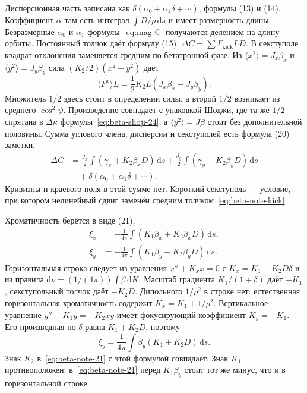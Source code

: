 \documentclass[aps,pra,preprint,a4paper,amsmath,amssymb,longbibliography]{revtex4-2}
\begin{document}
Дисперсионная часть записана как $\delta(\alpha_0+\alpha_1\delta+\cdots)$, формулы (13) и (14). Коэффициент $\alpha$ там есть интеграл $\int D/\rho\,\mathrm{d}s$ и имеет размерность длины. Безразмерные $\alpha_0$ и $\alpha_1$ формулы~\eqref{eq:mag-C} получаются делением на длину орбиты. Постоянный толчок даёт формулу (15), $\Delta C=\sum F_{\mathrm{kick}} L D$. В секступоле квадрат отклонения заменяется средним по бетатронной фазе. Из $\langle x^2\rangle=J_x\beta_x$ и $\langle y^2\rangle=J_y\beta_y$ сила $(K_2/2)(x^2-y^2)$ даёт
\begin{equation}
\label{eq:beta-note-kick}
\langle F^x\rangle L
=\frac{1}{2}K_2 L(J_x\beta_x-J_y\beta_y).
\end{equation}
Множитель $1/2$ здесь стоит в определении силы, а второй $1/2$ возникает из среднего $\cos^2\psi$. Произведение совпадает с упаковкой Шоджи, где та же $1/2$ спрятана в $\Delta\kappa$ формулы~\eqref{eq:beta-shoji-24}, а $\langle y^2\rangle=J\beta$ стоит без дополнительной половины. Сумма углового члена, дисперсии и секступолей есть формула (20) заметки,
\begin{equation}
\label{eq:beta-note-20}
\begin{aligned}
\Delta C
&=\frac{J_x}{2}\int(\gamma_x+K_2\beta_x D)\,\mathrm{d}s
+\frac{J_y}{2}\int(\gamma_y-K_2\beta_y D)\,\mathrm{d}s
\\
&\quad+\delta(\alpha_0+\alpha_1\delta+\cdots).
\end{aligned}
\end{equation}
Кривизны и краевого поля в этой сумме нет. Короткий секступоль --- условие, при котором нелинейный сдвиг заменён средним толчком~\eqref{eq:beta-note-kick}.

Хроматичность берётся в виде (21),
\begin{equation}
\label{eq:beta-note-21}
\begin{aligned}
\xi_x
&=-\frac{1}{4\pi}\int(K_1\beta_x+K_2\beta_x D)\,\mathrm{d}s,
\\
\xi_y
&=-\frac{1}{4\pi}\int(K_1\beta_y-K_2\beta_y D)\,\mathrm{d}s.
\end{aligned}
\end{equation}
Горизонтальная строка следует из уравнения $x''+K_x x=0$ с $K_x=K_1-K_2 D\delta$ и из правила $\mathrm{d}\nu=(1/(4\pi))\int\beta\,\mathrm{d}K$. Масштаб градиента $K_1/(1+\delta)$ даёт $-K_1$, секступольный толчок даёт $-K_2 D$. Дипольного $1/\rho^2$ в строке нет: естественная горизонтальная хроматичность содержит $K_x=K_1+1/\rho^2$. Вертикальное уравнение $y''-K_1 y=-K_2 xy$ имеет фокусирующий коэффициент $K_y=-K_1$. Его производная по $\delta$ равна $K_1+K_2 D$, поэтому
\begin{equation}
\label{eq:beta-xi-vert}
\xi_y
=\frac{1}{4\pi}\int\beta_y(K_1+K_2 D)\,\mathrm{d}s.
\end{equation}
Знак $K_2$ в~\eqref{eq:beta-note-21} с этой формулой совпадает. Знак $K_1$ противоположен: в~\eqref{eq:beta-note-21} перед $K_1\beta_y$ стоит тот же минус, что и в горизонтальной строке.
\end{document}
